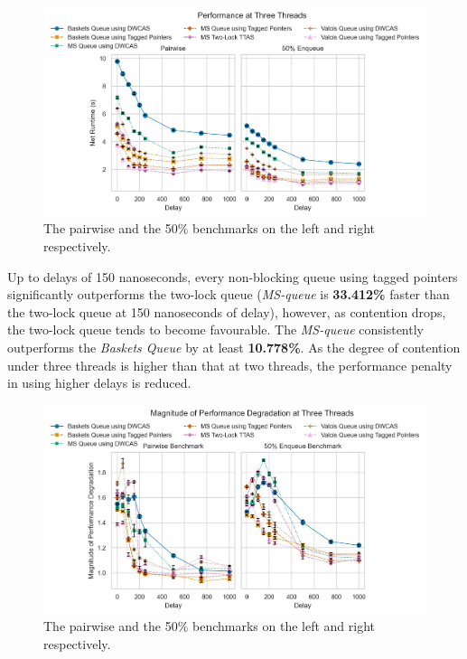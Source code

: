 \begin{figure}[!ht]
    \centering
    \includegraphics[width=1\textwidth]{images/plots/delay_thread_3.jpg}
    \caption{The pairwise and the 50\% benchmarks on the left and right respectively.}
    \label{fig:perf_3_thread}
\end{figure}


Up to delays of 150 nanoseconds, every non-blocking queue using tagged pointers
significantly outperforms the two-lock queue (\emph{MS-queue} is
\textbf{33.412\%} faster than the two-lock queue at 150 nanoseconds of delay),
however, as contention drops, the two-lock queue tends to become favourable. 
The \emph{MS-queue} consistently outperforms the \emph{Baskets Queue} by at least
\textbf{10.778\%}.
As the degree of contention under three threads is higher than that at two
threads, the performance penalty in using higher delays is reduced.

\begin{figure}[!ht]
    \centering
    \includegraphics[width=1\textwidth]{images/plots/speedup_2.jpg}
    \caption{The pairwise and the 50\% benchmarks on the left and right respectively.}
    \label{fig:perf_deg_2_thread}
\end{figure}

